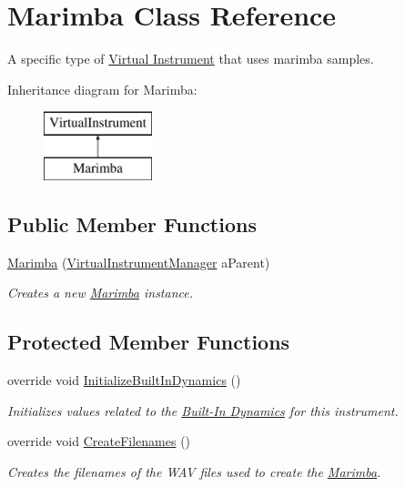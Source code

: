 \hypertarget{class_marimba}{}\section{Marimba Class Reference}
\label{class_marimba}


A specific type of \hyperlink{group___v_i}{Virtual Instrument} that uses marimba samples.  


Inheritance diagram for Marimba\+:\begin{figure}[H]
\begin{center}
\leavevmode
\includegraphics[height=2.000000cm]{class_marimba}
\end{center}
\end{figure}
\subsection*{Public Member Functions}
\begin{DoxyCompactItemize}
\item 
\hyperlink{group___mar_construct_ga48c946fe0f78f8905a8e4d063cbc0fa2}{Marimba} (\hyperlink{class_virtual_instrument_manager}{Virtual\+Instrument\+Manager} a\+Parent)
\begin{DoxyCompactList}\small\item\em Creates a new \hyperlink{class_marimba}{Marimba} instance. \end{DoxyCompactList}\end{DoxyCompactItemize}
\subsection*{Protected Member Functions}
\begin{DoxyCompactItemize}
\item 
override void \hyperlink{group___mar_virt_func_ga293d829cb8571c21452c23e90968b2d8}{Initialize\+Built\+In\+Dynamics} ()
\begin{DoxyCompactList}\small\item\em Initializes values related to the \hyperlink{group___audio_DefBID}{Built-\/\+In Dynamics} for this instrument. \end{DoxyCompactList}\item 
override void \hyperlink{group___mar_virt_func_gae57d9737fd07708dc7e13e74ee777878}{Create\+Filenames} ()
\begin{DoxyCompactList}\small\item\em Creates the filenames of the W\+AV files used to create the \hyperlink{class_marimba}{Marimba}. \end{DoxyCompactList}\end{DoxyCompactItemize}
